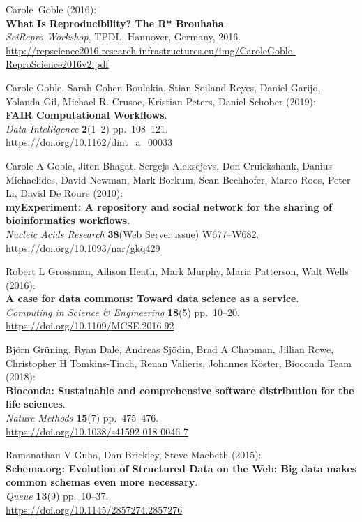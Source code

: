 Carole~Goble (2016):\\
\textbf{What Is Reproducibility? The R* Brouhaha}.\\
\emph{SciRepro Workshop}, TPDL, Hannover, Germany, 2016.
\url{http://repscience2016.research-infrastructures.eu/img/CaroleGoble-ReproScience2016v2.pdf}

Carole Goble, Sarah Cohen-Boulakia, Stian Soiland-Reyes, Daniel
Garijo, Yolanda Gil, Michael R. Crusoe, Kristian Peters, Daniel Schober
(2019):\\
\textbf{FAIR Computational Workflows}.\\
\emph{Data Intelligence} \textbf{2}(1--2) pp.~108--121.\\
\url{https://doi.org/10.1162/dint_a_00033}

Carole A Goble, Jiten Bhagat, Sergejs Aleksejevs, Don
Cruickshank, Danius Michaelides, David Newman, Mark Borkum, Sean
Bechhofer, Marco Roos, Peter Li, David De Roure (2010):\\
\textbf{myExperiment: A repository and social network for the sharing of
bioinformatics workflows}.\\
\emph{Nucleic Acids Research} \textbf{38}(Web Server issue)
W677--W682.\\
\url{https://doi.org/10.1093/nar/gkq429}


Robert L Grossman, Allison Heath, Mark Murphy, Maria Patterson,
Walt Wells (2016):\\
\textbf{A case for data commons: Toward data science as a service}.\\
\emph{Computing in Science \& Engineering} \textbf{18}(5) pp.~10--20.\\
\url{https://doi.org/10.1109/MCSE.2016.92}

Björn Grüning, Ryan Dale, Andreas Sjödin, Brad A Chapman,
Jillian Rowe, Christopher H Tomkins-Tinch, Renan Valieris, Johannes
Köster, Bioconda Team (2018):\\
\textbf{Bioconda: Sustainable and comprehensive software distribution
for the life sciences}.\\
\emph{Nature Methods} \textbf{15}(7) pp.~475--476.\\
\url{https://doi.org/10.1038/s41592-018-0046-7}

Ramanathan V Guha, Dan Brickley, Steve Macbeth (2015):\\
\textbf{Schema.org: Evolution of Structured Data on the Web: Big data
makes common schemas even more necessary}.\\
\emph{Queue} \textbf{13}(9) pp.~10--37.\\
\url{https://doi.org/10.1145/2857274.2857276}

